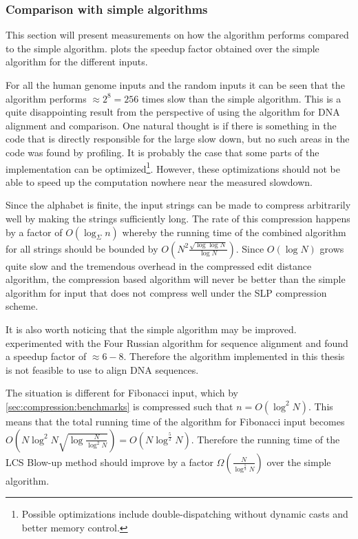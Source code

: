 \documentclass[twoside,11pt,openright]{report}
\begin{document}
\subsubsection{Comparison with simple algorithms}
This section will present measurements on how the algorithm performs compared to the simple algorithm.  plots the speedup factor obtained over the simple algorithm for the different inputs.

For all the human genome inputs and the random inputs it can be seen that the algorithm performs $\approx 2^{8} = 256$ times slow than the simple algorithm. This is a quite disappointing result from the perspective of using the algorithm for DNA alignment and comparison. One natural thought is if there is something in the code that is directly responsible for the large slow down, but no such areas in the code was found by profiling. It is probably the case that some parts of the implementation can be optimized\footnote{Possible optimizations include double-dispatching without dynamic casts and better memory control.}. However, these optimizations should not be able to speed up the computation nowhere near the measured slowdown.

Since the alphabet is finite, the input strings can be made to compress arbitrarily well by making the strings sufficiently long. The rate of this compression happens by a factor of $O(\log_{\Sigma}{n})$ whereby the running time of the combined algorithm for all strings should be bounded by $O\left( N^2 \frac{\sqrt{\log{\log{N}}}}{\log{N}} \right)$. Since $O(\log{N})$ grows quite slow and the tremendous overhead in the compressed edit distance algorithm, the compression based algorithm will never be better than the simple algorithm for input that does not compress well under the SLP compression scheme.

It is also worth noticing that the simple algorithm may be improved. \cite{LasseFourRussian} experimented with the Four Russian algorithm for sequence alignment and found a speedup factor of $\approx 6-8$. Therefore the algorithm implemented in this thesis is not feasible to use to align DNA sequences.

The situation is different for Fibonacci input, which by \cref{sec:compression:benchmarks} is compressed such that $n = O(\log^2{N})$. This means that the total running time of the algorithm for Fibonacci input becomes $O\left( N\log^2{N} \sqrt{\log{\frac{N}{\log^2{N}}}} \right) = O(N\log^{\frac{5}{2}}{N})$. Therefore the running time of the LCS Blow-up method should improve by a factor $\Omega\left( \frac{N}{\log^{\frac{5}{2}}{N}} \right)$ over the simple algorithm.
\end{document}
